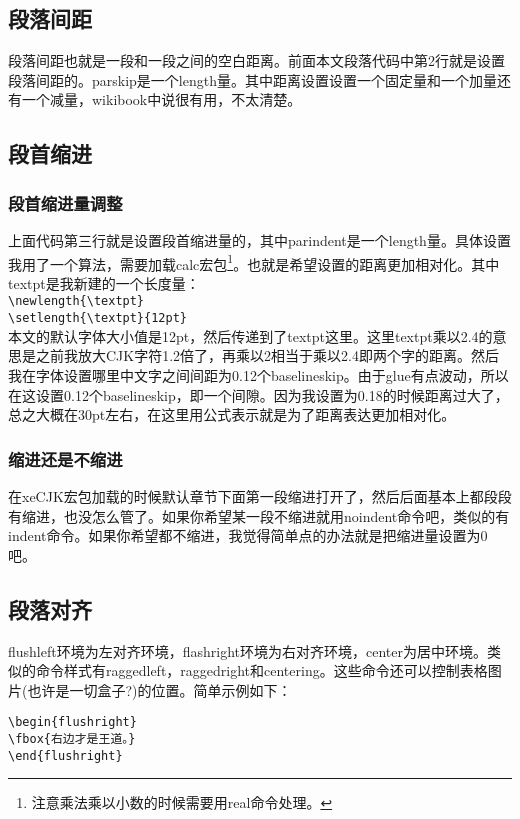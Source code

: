 \subsection{段落间距}
段落间距也就是一段和一段之间的空白距离。前面本文段落代码中第2行就是设置段落间距的。parskip是一个length量。其中距离设置设置一个固定量和一个加量还有一个减量，wikibook中说很有用，不太清楚。

\subsection{段首缩进}
\subsubsection{段首缩进量调整}
上面代码第三行就是设置段首缩进量的，其中parindent是一个length量。具体设置我用了一个算法，需要加载calc宏包\footnote{注意乘法乘以小数的时候需要用real命令处理。}。也就是希望设置的距离更加相对化。其中textpt是我新建的一个长度量：\\
\verb+\newlength{\textpt}+\\
\verb+\setlength{\textpt}{12pt}+\\ 
本文的默认字体大小值是12pt，然后传递到了textpt这里。这里textpt乘以2.4的意思是之前我放大CJK字符1.2倍了，再乘以2相当于乘以2.4即两个字的距离。然后我在字体设置哪里中文字之间间距为0.12个baselineskip。由于glue有点波动，所以在这设置0.12个baselineskip，即一个间隙。因为我设置为0.18的时候距离过大了，总之大概在30pt左右，在这里用公式表示就是为了距离表达更加相对化。

\subsubsection{缩进还是不缩进}
在xeCJK宏包加载的时候默认章节下面第一段缩进打开了，然后后面基本上都段段有缩进，也没怎么管了。如果你希望某一段不缩进就用noindent命令吧，类似的有indent命令。如果你希望都不缩进，我觉得简单点的办法就是把缩进量设置为0吧。

\subsection{段落对齐}
flushleft环境为左对齐环境，flashright环境为右对齐环境，center为居中环境。类似的命令样式有raggedleft，raggedright和centering。这些命令还可以控制表格图片(也许是一切盒子?)的位置。简单示例如下：
\begin{verbatim}
\begin{flushright}
\fbox{右边才是王道。}
\end{flushright}
\end{verbatim}
\begin{flushright}
\end{flushright}


